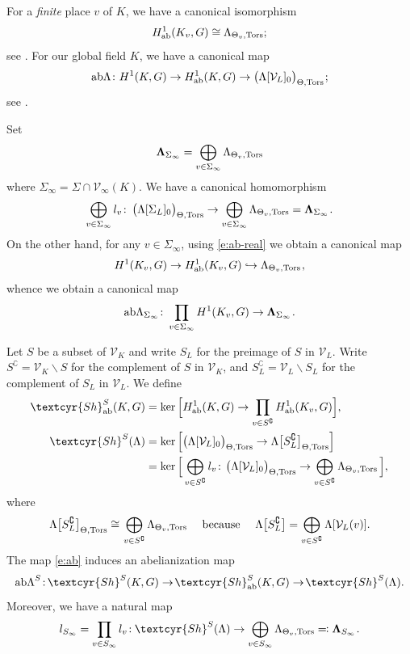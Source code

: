 \documentclass[11pt]{amsart}
\newcommand{\Sha}{{\!\textcyr{Sh}}}
\theoremstyle{plain}
\theoremstyle{definition}
\newcommand{\into}{\hookrightarrow}
\newcommand{\ab}{{\rm ab}}
\newcommand{\hs}{\kern 0.8pt}
\newcommand{\V}{{\mathcal V}}
\newcommand{\Tors}{{\rm Tors}}
\newcommand{\LambdaB}{{\boldsymbol{\Lambda}}}
\newcommand{\Thv}{{\Theta_v}}
\newcommand{\Thvt}{{\Theta_v,\Tors}}
\newcommand{\Tht}{{\Theta,\Tors}}
\newcommand{\abLambda}{{{\rm ab}\Lambda}}
\begin{document}
For a {\em finite} place $v$ of $K$, we have a canonical isomorphism
$$H^1_\ab(K_v,G)\cong \Lambda_{\Theta_v,\Tors};$$
see \cite[Theorem 5.5.2(1)]{BK}.
For our global field $K$, we have a canonical map
\begin{equation}\label{e:ab}
\abLambda\colon H^1(K,G)\to H^1_\ab(K,G)\to \big(\Lambda[\V_L]_0\big)_\Tht\hs;
\end{equation}
see \cite[Theorem 5.5.4(1)]{BK}.

Set
\[\LambdaB_{\Sigma_\infty}=\bigoplus_{v\in\Sigma_\infty} \Lambda_{\Thv,\Tors}\]
where $\Sigma_\infty=\Sigma\cap\V_\infty(K)$.
We have a canonical homomorphism
\[\bigoplus_{v\in\Sigma_\infty} l_v\colon\,\big(\Lambda[\Sigma_L]_0\big)_{\Theta,\Tors}\to
      \bigoplus_{v\in\Sigma_\infty} \Lambda_{\Thv,\Tors}=\LambdaB_{\Sigma_\infty}\hs.\]
On the other hand, for any $v\in\Sigma_\infty$\hs, using \eqref{e:ab-real} we obtain a canonical map
\[ H^1(K_v,G)\to H^1_\ab(K_v,G)\into \Lambda_{\Thv,\Tors}\hs,\]
whence we obtain a canonical map
\[ \ab\Lambda_{\Sigma_\infty}\colon\prod_{v\in \Sigma_\infty} H^1(K_v,G)\to \LambdaB_{\Sigma_\infty}\hs.\]

Let $S$ be a subset of $\V_K$ and write $S_L$ for the preimage of $S$ in $\V_L$\hs.
Write $S^\complement=\V_K\smallsetminus S$ for the complement of $S$ in $\V_K$\hs,
and $S_L^\complement=\V_L\smallsetminus S_L$ for the complement of $S_L$ in $\V_L$.
We define
\begin{align*}
\Sha^S_\ab(K,G)&=\ker \Big[ H^1_\ab(K,G)\to\prod_{v\in S^\complement} H^1_\ab(K_v,G)\Big],\\ \notag
\Sha^S(\Lambda)&=\ker \Big[ \big(\Lambda[\V_L]_0\big)_{\Theta,\Tors}
     \to \Lambda\big[S_L^\complement\big]_{\Theta,\Tors}\Big]\\
   &= \ker \Big[\bigoplus_{v\in S^\complement}l_v\colon\hs  \big(\Lambda[\V_L]_0\big)_{\Theta,\Tors}\to \bigoplus_{v\in S^\complement} \Lambda_\Thvt\,\Big],
\end{align*}
where
\[\Lambda\big[S_L^\complement\big]_{\Theta,\Tors}
   \cong \hs \bigoplus_{v\in S^\complement} \Lambda_\Thvt\quad\  \text{because} \quad\ \Lambda\big[S_L^\complement\big]=\bigoplus_{v\in S^\complement}\Lambda[\V_L(v)].\]
The map \eqref{e:ab} induces an abelianization map
\begin{equation}\label{e:ab-Sha}
\abLambda^S\colon \Sha^S(K,G)\to \Sha^S_\ab(K,G)\to \Sha^S(\Lambda).
\end{equation}
Moreover, we have a natural map
\[ l_{S_\infty}=\prod_{v\in S_\infty}l_v\colon\hs \Sha^S(\Lambda)\to \bigoplus_{v\in S_\infty} \Lambda_\Thvt\eqqcolon\LambdaB_{S_\infty}\hs.\]
\end{document}
